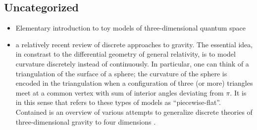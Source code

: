\documentclass[notitlepage, 10pt]{article}
\begin{document}
\subsection{Uncategorized}
\begin{itemize}
    \item Elementary introduction to toy models of three-dimensional quantum space \cite{barrett2003geometrical}
    \item \citeauthor{regge2000discrete} \cite{regge2000discrete} a relatively recent review of discrete approaches to gravity. 
        The essential idea, in constrast to the differential geometry of general relativity, is to model curvature discretely instead of continuously. 
        In particular, one can think of a triangulation of the surface of a sphere; the curvature of the sphere is encoded in the triangulation when a configuration of three (or more) triangles meet at a common vertex with sum of interior angles deviating from $\pi$.
        It is in this sense that \citeauthor{regge2000discrete} refers to these types of models as ``piecewise-flat''.
        Contained is an overview of various attempts to generalize discrete theories of three-dimensional gravity to four dimensions \cite[Section III]{regge2000discrete}.
\end{itemize}

\clearpage
\printbibliography
\end{document}
